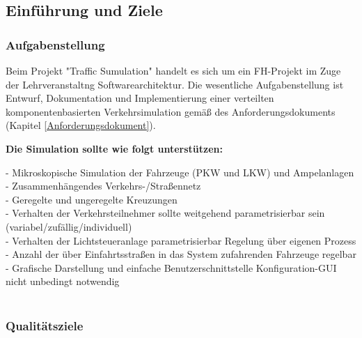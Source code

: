 \documentclass[12pt,a4paper,bibliography=totocnumbered,listof=totocnumbered]{scrartcl}
\begin{document}
\subsection{Einführung und Ziele}
\subsubsection{Aufgabenstellung} \label{Aufgabenstellung}
Beim Projekt "Traffic Sumulation" handelt es sich um ein FH-Projekt im Zuge der Lehrveranstaltng Softwarearchitektur. Die wesentliche Aufgabenstellung ist Entwurf, Dokumentation und Implementierung einer verteilten komponentenbasierten Verkehrsimulation gemäß des Anforderungsdokuments (Kapitel \ref{Anforderungsdokument}).

\textbf{Die Simulation sollte wie folgt unterstützen:}

- Mikroskopische Simulation der Fahrzeuge (PKW und LKW) und Ampelanlagen \\
- Zusammenhängendes Verkehrs-/Straßennetz \\
- Geregelte und ungeregelte Kreuzungen \\
- Verhalten der Verkehrsteilnehmer sollte weitgehend parametrisierbar sein (variabel/zufällig/individuell) \\
- Verhalten der Lichtsteueranlage parametrisierbar Regelung über eigenen Prozess \\
- Anzahl der über Einfahrtsstraßen in das System zufahrenden Fahrzeuge regelbar \\
- Grafische Darstellung und einfache Benutzerschnittstelle Konfiguration-GUI nicht unbedingt notwendig \\
 \\
\subsubsection{Qualitätsziele}
\end{document}
